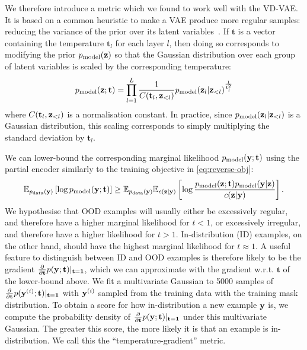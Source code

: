 We therefore introduce a metric which we found to work well with the VD-VAE. It
is based on a common heuristic to make a VAE produce more regular samples:
reducing the variance of the prior over its latent
variables~\citep{vahdat2020nvae}. If $\mathbf{t}$ is a vector containing the
temperature $\mathbf{t}_l$ for each layer $l$, then doing so corresponds to
modifying the prior $p_{\rm{model}}{}(\mathbf{z}{})$ so that the Gaussian distribution over each
group of latent variables is scaled by the corresponding temperature:
\begin{equation}
  p_{\rm{model}}{}(\mathbf{z}{}; \mathbf{t}) = \prod_{l=1}^L  \frac{1}{C(\mathbf{t}_l, \mathbf{z}{}_{<l})} p_{\rm{model}}{}(\mathbf{z}{}_l|\mathbf{z}{}_{<l})^{\frac{1}{\mathbf{t}^2_l}}
\end{equation}
where $C(\mathbf{t}_l, \mathbf{z}{}_{<l})$ is a normalisation constant. In practice, since
$p_{\rm{model}}{}(\mathbf{z}{}_l|\mathbf{z}{}_{<l})$ is a Gaussian distribution, this scaling corresponds to
simply multiplying the standard deviation by $\mathbf{t}_l$.

We can lower-bound the corresponding marginal likelihood $p_{\rm{model}}{}(\mathbf{y}{};
\mathbf{t})$ using the partial encoder similarly to the training objective in
\cref{eq:reverse-obj}:
\begin{align}
  \mathbb{E}_{p_{\rm{data}}{}(\mathbf{y}{})} \left[ \log p_{\rm{model}}(\mathbf{y}{}; \mathbf{t}) \right] \geq \mathbb{E}_{p_{\rm{data}}{}(\mathbf{y}{})}\mathbb{E}_{c{}(\mathbf{z}{}|\mathbf{y}{})} \left[ \log\frac{p_{\rm{model}}{}(\mathbf{z}{}; \mathbf{t})p_{\rm{model}}{}(\mathbf{y}{}|\mathbf{z}{})}{c{}(\mathbf{z}{}|\mathbf{y}{})} \right] .
\end{align}
We hypothesise that OOD examples will usually either be excessively regular, and
therefore have a higher marginal likelihood for $t<1$, or excessively irregular,
and therefore have a higher likelihood for $t>1$. In-distribution (ID) examples,
on the other hand, should have the highest marginal likelihood for $t\approx 1$.
A useful feature to distinguish between ID and OOD examples is therefore likely
to be the gradient $\frac{\partial}{\partial\mathbf{t}}p(\mathbf{y}{};
\mathbf{t})\lvert_{\mathbf{t}=\mathbf{1}}$, which we can approximate with the
gradient w.r.t. $\mathbf{t}$ of the lower-bound above. We fit a multivariate
Gaussian to 5000 samples of
$\frac{\partial}{\partial\mathbf{t}}p(\mathbf{y}{}^{(i)};
\mathbf{t})\lvert_{\mathbf{t}=\mathbf{1}}$ with $\mathbf{y}{}^{(i)}$ sampled from
the training data with the training mask distribution. To obtain a score for how
in-distribution a new example $\mathbf{y}{}$ is, we compute the probability density
of $\frac{\partial}{\partial\mathbf{t}}p(\mathbf{y}{};
\mathbf{t})\lvert_{\mathbf{t}=\mathbf{1}}$ under this multivariate Gaussian. The
greater this score, the more likely it is that an example is in-distribution. We
call this the ``temperature-gradient'' metric.

